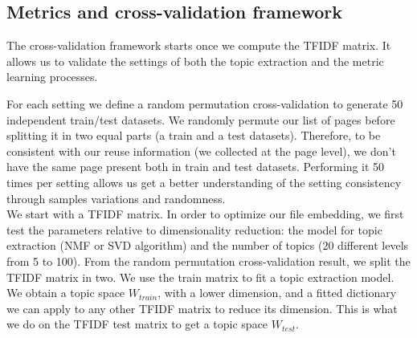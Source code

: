 \documentclass[a4paper]{article}
\begin{document}
	\subsection{Metrics and cross-validation framework}
	
	The cross-validation framework starts once we compute the \ac{TFIDF} matrix. It allows us to validate the settings of both the topic extraction and the metric learning processes.
	
	
	For each setting we define a random permutation cross-validation to generate 50 independent train/test datasets. We randomly permute our list of pages before splitting it in two equal parts (a train and a test datasets). Therefore, to be consistent with our reuse information (we collected at the page level), we don't have the same page present both in train and test datasets. Performing it 50 times per setting allows us get a better understanding of the setting consistency through samples variations and randomness.\\
	
	We start with a \ac{TFIDF} matrix. In order to optimize our file embedding, we first test the parameters relative to dimensionality reduction: the model for topic extraction (\ac{NMF} or \ac{SVD} algorithm) and the number of topics (20 different levels from 5 to 100). From the random permutation cross-validation result, we split the \ac{TFIDF} matrix in two. We use the train matrix to fit a topic extraction model. We obtain a topic space $W_{train}$, with a lower dimension, and a fitted dictionary we can apply to any other \ac{TFIDF} matrix to reduce its dimension. This is what we do on the \ac{TFIDF} test matrix to get a topic space $W_{test}$. 
	
\end{document}
